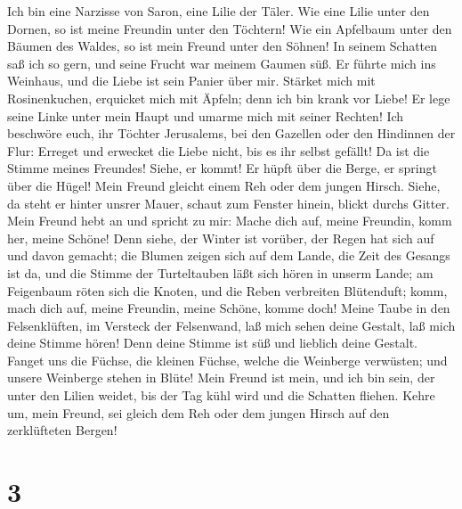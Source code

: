  Ich bin eine Narzisse von Saron, eine Lilie der Täler.
 Wie eine Lilie unter den Dornen, so ist meine Freundin
unter den Töchtern!  Wie ein Apfelbaum unter den Bäumen
des Waldes, so ist mein Freund unter den Söhnen! In seinem Schatten saß
ich so gern, und seine Frucht war meinem Gaumen süß.  Er
führte mich ins Weinhaus, und die Liebe ist sein Panier über mir.
 Stärket mich mit Rosinenkuchen, erquicket mich mit
Äpfeln; denn ich bin krank vor Liebe!  Er lege seine Linke
unter mein Haupt und umarme mich mit seiner Rechten!  Ich
beschwöre euch, ihr Töchter Jerusalems, bei den Gazellen oder den
Hindinnen der Flur: Erreget und erwecket die Liebe nicht, bis es ihr
selbst gefällt!  Da ist die Stimme meines Freundes! Siehe,
er kommt! Er hüpft über die Berge, er springt über die Hügel!
 Mein Freund gleicht einem Reh oder dem jungen Hirsch.
Siehe, da steht er hinter unsrer Mauer, schaut zum Fenster hinein,
blickt durchs Gitter.  Mein Freund hebt an und spricht zu
mir: Mache dich auf, meine Freundin, komm her, meine Schöne!
 Denn siehe, der Winter ist vorüber, der Regen hat sich
auf und davon gemacht;  die Blumen zeigen sich auf dem
Lande, die Zeit des Gesangs ist da, und die Stimme der Turteltauben läßt
sich hören in unserm Lande;  am Feigenbaum röten sich die
Knoten, und die Reben verbreiten Blütenduft; komm, mach dich auf, meine
Freundin, meine Schöne, komme doch!  Meine Taube in den
Felsenklüften, im Versteck der Felsenwand, laß mich sehen deine Gestalt,
laß mich deine Stimme hören! Denn deine Stimme ist süß und lieblich
deine Gestalt.  Fanget uns die Füchse, die kleinen
Füchse, welche die Weinberge verwüsten; und unsere Weinberge stehen in
Blüte!  Mein Freund ist mein, und ich bin sein, der unter
den Lilien weidet, bis der Tag kühl wird und die Schatten fliehen.
 Kehre um, mein Freund, sei gleich dem Reh oder dem
jungen Hirsch auf den zerklüfteten Bergen!

\hypertarget{section-2}{%
\section{3}\label{section-2}}

